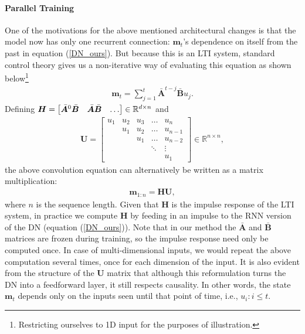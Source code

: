 \documentclass{article}
\def\vm{{\bm{m}}}
\def\mA{{\bm{A}}}
\def\mB{{\bm{B}}}
\def\mH{{\bm{H}}}
\def\mU{{\bm{U}}}
\begin{document}
\paragraph{Parallel Training} One of the motivations for the above mentioned architectural changes is that the model now has only one recurrent connection: $\vm_t$'s dependence on itself from the past in equation (\ref{DN_ours}). But because this is an LTI system, standard control theory \citep{aastrom2010feedback} gives us a non-iterative way of evaluating this equation as shown below\footnote{Restricting ourselves to 1D input for the purposes of illustration.} 
\begin{align}
    \vm_t =  \sum_{j=1}^{t} \bar{\mA}^{t-j} \bar{\mB} u_j.
\end{align}
Defining $\mH = \begin{bmatrix} \Bar{\mA}^0 \bar{\mB} & \Bar{\mA}  \bar{\mB} & \hdots \end{bmatrix} \in \mathbb{R}^{d \times n}$ and 
\begin{align}
    \mU = \begin{bmatrix} u_1 & u_2 & u_3 & \hdots & u_n \\
                              & u_1 & u_2 & \hdots & u_{n-1}\\ 
                              &     & u_1 & \hdots & u_{n-2} \\
                              &     &     & \ddots & \vdots \\
                              &     &     &         &  u_1\end{bmatrix} \in \mathbb{R}^{n \times n},
\end{align}
the above convolution equation can alternatively be written as a matrix multiplication:
\begin{align} \label{parallel_time}
    \vm_{1:n} = \mH \mU,
\end{align}
where $n$ is the sequence length. Given that $\mH$ is the impulse response of the LTI system, in practice we compute $\mH$ by feeding in an impulse to the RNN version of the DN (equation (\ref{DN_ours})). Note that in our method the $\bar{\mA}$ and $\bar{\mB}$ matrices are frozen during training, so the impulse response need only be computed once. In case of multi-dimensional inputs, we would repeat the above computation several times, once for each dimension of the input. It is also evident from the structure of the $\mU$ matrix that although this reformulation turns the DN into a feedforward layer, it still respects causality. In other words, the state $\vm_t$ depends only on the inputs seen until that point of time, i.e., $u_i : i \leq t$.   
\end{document}
